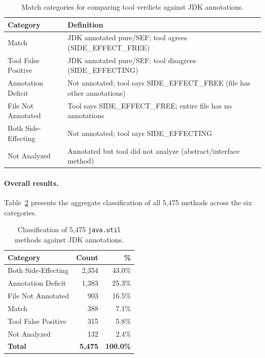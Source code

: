 \begin{table}[H]
\centering
\caption{Match categories for comparing tool verdicts against JDK annotations.}
\label{tab:categories}
\begin{tabular}{lp{8cm}}
\toprule
\textbf{Category} & \textbf{Definition} \\
\midrule
Match & JDK annotated pure/SEF; tool agrees (SIDE\_EFFECT\_FREE) \\
Tool False Positive & JDK annotated pure/SEF; tool disagrees (SIDE\_EFFECTING) \\
Annotation Deficit & Not annotated; tool says SIDE\_EFFECT\_FREE (file has other annotations) \\
File Not Annotated & Tool says SIDE\_EFFECT\_FREE; entire file has no annotations \\
Both Side-Effecting & Not annotated; tool says SIDE\_EFFECTING \\
Not Analyzed & Annotated but tool did not analyze (abstract/interface method) \\
\bottomrule
\end{tabular}
\end{table}




\paragraph{Overall results.}
Table~\ref{tab:results} presents the aggregate classification of all 5,475 methods across the six categories.

\begin{table}[h]
\centering
\caption{Classification of 5,475 \texttt{java.util} methods against JDK annotations.}
\label{tab:results}
\begin{tabular}{lrr}
\toprule
\textbf{Category} & \textbf{Count} & \textbf{\%} \\
\midrule
Both Side-Effecting   & 2,354 & 43.0\% \\
Annotation Deficit    & 1,383 & 25.3\% \\
File Not Annotated    &   903 & 16.5\% \\
Match                 &   388 &  7.1\% \\
Tool False Positive   &   315 &  5.8\% \\
Not Analyzed          &   132 &  2.4\% \\
\midrule
\textbf{Total}        & \textbf{5,475} & \textbf{100.0\%} \\
\bottomrule
\end{tabular}
\end{table}


